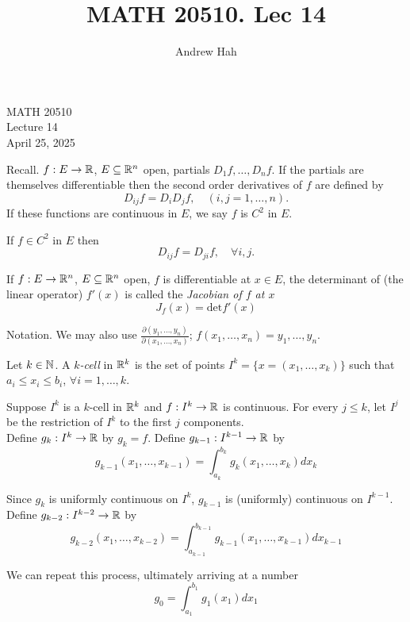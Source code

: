 \documentclass[11pt]{article}
\title{MATH 20510. Lec 14}
\author{Andrew Hah}
\begin{document}
\pagestyle{plain}
\begin{center}
{\Large MATH 20510} \\
{\Large Lecture 14} \\
\vspace{.2in}
April 25, 2025
\end{center}

Recall. $f: E \to \mathbb{R}$, $E \subseteq \mathbb{R}^n$ open, partials $D_1f, \dots, D_nf$. If the partials are themselves differentiable then the second order derivatives of $f$ are defined by $$D_{ij}f = D_iD_jf, \quad (i, j = 1, \dots, n).$$ If these functions are continuous in $E$, we say $f$ is $C^2$ in $E$.

\begin{theorem} If $f \in C^2$ in $E$ then $$D_{ij}f = D_{ji}f, \quad \forall i, j.$$
\end{theorem}

\begin{definition}
  If $f: E \to \mathbb{R}^n$, $E \subseteq \mathbb{R}^n$ open, $f$ is differentiable at $x \in E$, the determinant of (the linear operator) $f'(x)$ is called the \emph{Jacobian of $f$ at $x$} $$J_f(x) = \mathrm{det} f'(x)$$
\end{definition}

Notation. We may also use $\frac{\partial (y_1, \dots, y_n)}{\partial (x_1, \dots, x_n)}$; $f(x_1, \dots, x_n) = y_1, \dots, y_n$.

\begin{definition} Let $k \in \mathbb{N}$. A \emph{$k$-cell} in $\mathbb{R}^k$ is the set of points $I^k = \{ x = (x_1, \dots, x_k) \}$ such that $a_i \le x_i \le b_i$, $\forall i = 1, \dots, k$.
\end{definition}

Suppose $I^k$ is a $k$-cell in $\mathbb{R}^k$ and $f: I^k \to \mathbb{R}$ is continuous. For every $j \le k$, let $I^j$ be the restriction of $I^k$ to the first $j$ components.\\

Define $g_k: I^k \to \mathbb{R}$ by $g_k= f$. Define $g_{k - 1}: I^{k - 1} \to \mathbb{R}$ by $$g_{k - 1}(x_1, \dots, x_{k-1}) = \int_{a_k}^{b_k}g_k(x_1, \dots, x_k) d x_k$$

Since $g_k$ is uniformly continuous on $I^k$, $g_{k - 1}$ is (uniformly) continuous on $I^{k - 1}$. Define $g_{k - 2}: I^{k - 2} \to \mathbb{R}$ by $$g_{k - 2}(x_1, \dots, x_{k - 2}) = \int_{a_{k - 1}}^{b_{k - 1}}g_{k - 1}(x_1, \dots, x_{k - 1}) dx_{k - 1}$$

We can repeat this process, ultimately arriving at a number $$g_0 = \int_{a_1}^{b_1} g_1(x_1) dx_1$$
\end{document}
